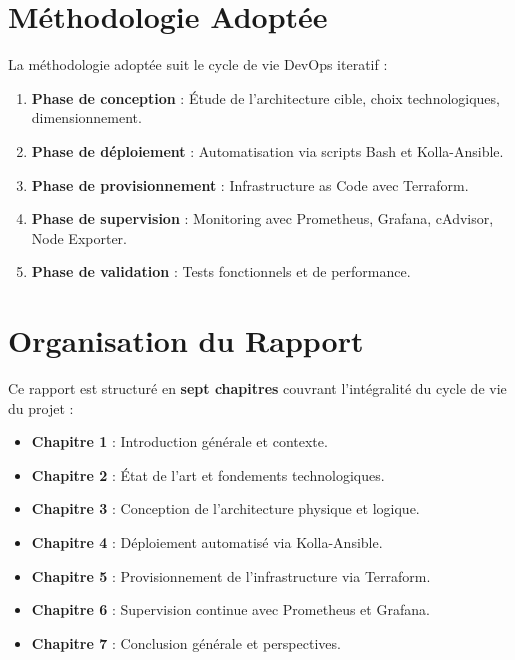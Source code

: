 \documentclass[12pt,a4paper,oneside]{book}
\begin{document}
\section{M\'ethodologie Adopt\'ee}

La m\'ethodologie adopt\'ee suit le cycle de vie DevOps iteratif :
\begin{enumerate}
    \item \textbf{Phase de conception} : \'Etude de l'architecture cible, choix technologiques, dimensionnement.
    \item \textbf{Phase de d\'eploiement} : Automatisation via scripts Bash et Kolla-Ansible.
    \item \textbf{Phase de provisionnement} : Infrastructure as Code avec Terraform.
    \item \textbf{Phase de supervision} : Monitoring avec Prometheus, Grafana, cAdvisor, Node Exporter.
    \item \textbf{Phase de validation} : Tests fonctionnels et de performance.
\end{enumerate}

\section{Organisation du Rapport}

Ce rapport est structur\'e en \textbf{sept chapitres} couvrant l'int\'egralit\'e du cycle de vie du projet :

\begin{itemize}
    \item \textbf{Chapitre 1} : Introduction g\'en\'erale et contexte.
    \item \textbf{Chapitre 2} : \'Etat de l'art et fondements technologiques.
    \item \textbf{Chapitre 3} : Conception de l'architecture physique et logique.
    \item \textbf{Chapitre 4} : D\'eploiement automatis\'e via Kolla-Ansible.
    \item \textbf{Chapitre 5} : Provisionnement de l'infrastructure via Terraform.
    \item \textbf{Chapitre 6} : Supervision continue avec Prometheus et Grafana.
    \item \textbf{Chapitre 7} : Conclusion g\'en\'erale et perspectives.
\end{itemize}

\end{document}
